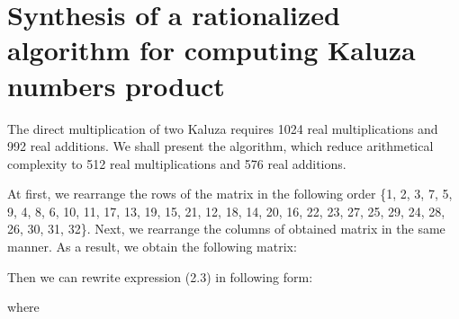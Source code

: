 \documentclass{jtacs}
\numberwithin{equation}{section}
\begin{document}
\section{Synthesis of a rationalized algorithm for computing Kaluza numbers
product}

The direct multiplication of two Kaluza requires 1024 real multiplications and 992 real additions. We shall present the algorithm, which reduce arithmetical complexity to 512 real multiplications and 576 real additions.

At first, we rearrange the rows of the matrix in the following order \{1, 2, 3, 7, 5, 9, 4, 8, 6, 10, 11, 17, 13, 19, 15, 21, 12, 18, 14, 20, 16, 22, 23, 27, 25, 29, 24, 28, 26, 30, 31, 32\}. Next, we rearrange the columns of obtained matrix in the same manner. As a result, we obtain the following matrix:

Then we can rewrite expression (2.3) in following form:


where



\begin{center}

\begin{adjustbox}{width=0.55\textwidth, margin= 0 5 0 0}

\end{adjustbox}\end{center}

\begin{center}

\begin{adjustbox}{width=0.55\textwidth, margin= 0 0}

\end{adjustbox}\end{center}

\begin{center}

\begin{adjustbox}{width=0.55\textwidth, margin= 0 0}

\end{adjustbox}\end{center}

\begin{center}

\begin{adjustbox}{width=0.55\textwidth, margin= 0 0}

\end{adjustbox}\end{center}
\end{document}
